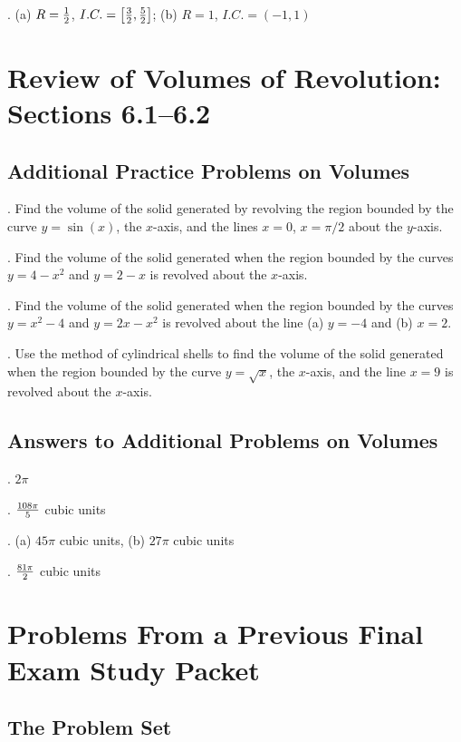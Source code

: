 \documentclass[12pt]{article}
\begin{document}
.  (a) $R={{1}\over{2}}$, $I.C.=\left [ {{3}\over{2}}, 
{{5}\over{2}} \right ]$; (b) $R=1$, $I.C. = (-1,1)$

\section{Review of Volumes of Revolution: Sections 6.1--6.2}

\subsection*{Additional Practice Problems on Volumes}

.  Find the volume of the solid generated by 
revolving the
region bounded by the curve $y=\sin(x)$, the $x$-axis, and the 
lines $x=0$,
$x=\pi/2$ about the $y$-axis.

\medskip
{}.  Find the volume of the solid generated when the 
region bounded by the curves $y=4-x^2$ and $y=2-x$ is 
revolved about the $x$-axis.

\medskip
{}.  Find the volume of the solid generated when the 
region bounded by the curves $y=x^2-4$ and $y=2x-x^2$ is 
revolved about the line (a) $y=-4$ and (b) $x=2$.

\medskip
{}.  Use the method of cylindrical shells to find the 
volume of the 
solid generated when the region bounded 
by the curve $y=\sqrt{x}$, the $x$-axis, and the line $x=9$ is 
revolved about the $x$-axis. 

\subsection*{Answers to Additional Problems on Volumes}

.  $2 \pi$ 

\medskip
{}.  ${{108 \pi}\over{5}}$ cubic units

\medskip
{}.  (a) $45 \pi$ cubic units,
(b) $27 \pi$ cubic units

\medskip
{}.  ${{81 \pi}\over{2}}$ cubic units

\section{Problems From a Previous Final Exam Study Packet}

\subsection*{The Problem Set}
\end{document}
